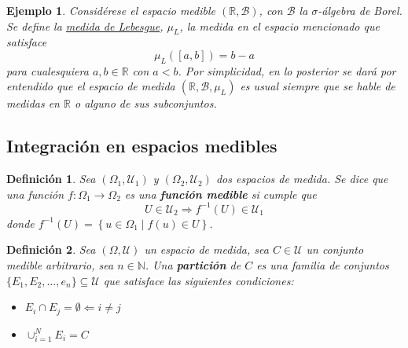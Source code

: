 \documentclass[12pt,letterpaper,draft]{book}
\newtheorem{definicion}{Definición}[chapter]
\newtheorem{ejemplo}{Ejemplo}[chapter]
\newcommand{\R}{\mathbb{R}}
\newcommand{\N}{\mathbb{N}}
\newcommand{\talque}{\mathrel{}\middle|\mathrel{}}
\begin{document}

\begin{ejemplo}
Considérese el espacio medible $(\R, \mathcal{B})$, con $\mathcal{B}$ la $\sigma$-álgebra de Borel. Se define la \ul{medida de Lebesgue}, $\mu_L$, la medida en el espacio mencionado que satisface 
\begin{equation}
\mu_L([a,b]) = b-a
\end{equation}
para cualesquiera $a,b \in \R$ con $a<b$. Por simplicidad, en lo posterior se dará por entendido que el espacio de medida $(\R, \mathcal{B},\mu_L)$ es \textit{usual} siempre que se hable de medidas en $\R$ o alguno de sus subconjuntos.
\end{ejemplo}


\subsection{Integración en espacios medibles}

\begin{definicion}
Sea $(\Omega_1, \mathcal{U}_1)$ y $(\Omega_2, \mathcal{U}_2)$ dos espacios de medida. Se dice que una función $f:\Omega_1\rightarrow\Omega_2$ es una \textbf{función medible} si cumple que
\begin{equation}
U \in \mathcal{U}_2 \Rightarrow f^{-1}(U) \in \mathcal{U}_1 
\end{equation}
donde $f^{-1}(U) = \left\{ u\in \Omega_1 \talque f(u) \in U \right\}$.
\end{definicion}

\begin{definicion}
Sea $(\Omega, \mathcal{U})$ un espacio de medida, sea $C \in \mathcal{U}$ un conjunto medible arbitrario, sea $n\in \N$. Una \textbf{partición} de $C$ es una familia de conjuntos $\{E_1, E_2, \dots, e_n\} \subseteq\mathcal{U}$ que satisface las siguientes condiciones:
\begin{itemize}
\item $E_i \cap E_j = \emptyset \Leftarrow i\neq j $
\item $\cup_{i=1}^{N}  E_i = C $
\end{itemize}
\end{definicion}
\end{document}

